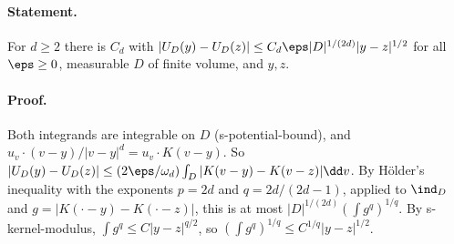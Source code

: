 \paragraph{Statement.} For $d\geq2$ there is $C_d$ with $|U_D(y)-U_D(z)|\leq C_d\eps|D|^{1/(2d)}|y-z|^{1/2}$ for
all $\eps\geq0$, measurable $D$ of finite volume, and $y,z$.
\paragraph{Proof.} Both integrands are integrable on $D$ (s-potential-bound), and $u_v\cdot(v-y)/|v-y|^d=u_v\cdot K(v-y)$.
So $|U_D(y)-U_D(z)|\leq(2\eps/\omega_d)\int_D|K(v-y)-K(v-z)|\dd v$. By Hölder's inequality with the exponents
$p=2d$ and $q=2d/(2d-1)$, applied to $\ind_D$ and $g=|K(\cdot-y)-K(\cdot-z)|$, this is at most
$|D|^{1/(2d)}(\int g^q)^{1/q}$. By s-kernel-modulus, $\int g^q\leq C|y-z|^{q/2}$, so
$(\int g^q)^{1/q}\leq C^{1/q}|y-z|^{1/2}$.
